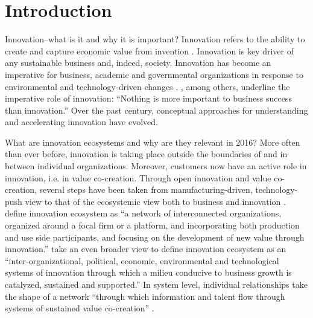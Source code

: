 \chapter{Introduction}
\label{chapter:intro}

Innovation--what is it and why it is important? Innovation refers to the ability to create and capture economic value from invention \citep{Hagel2005TheSpecialization}. Innovation is key driver of any sustainable business and, indeed, society. Innovation has become an imperative for business, academic and governmental organizations in response to environmental and technology-driven changes \citep{Drucker2015InnovationPrinciples,VandeVen1986CentralInnovation,Gupta2007InnovationAnalysis,Schumpeter1942CapitalismDemocracy}. \cite{Carlson2006}, among others, underline the imperative role of innovation: ``Nothing is more important to business success than innovation.'' Over the past century, conceptual approaches for understanding and accelerating innovation have evolved. 

What are innovation ecosystems and why are they relevant in 2016? More often than ever before, innovation is taking place outside the boundaries of and in between individual organizations. Moreover, customers now have an active role in innovation, i.e. in value co-creation. Through open innovation and value co-creation, several steps have been taken from manufacturing-driven, technology-push view \citep{Schumpeter1934TheCycle,Schumpeter1942CapitalismDemocracy,Schumpeter1950TheSocialism} to that of the ecosystemic view both to business and innovation \citep{Russell2011TransformingOrchestration,Moore1993PredatorsCompetition,Jarvi2013}. \cite{Autio2013InnovationManagement} define innovation ecosystem as ``a network of interconnected organizations, organized around a focal firm or a platform, and incorporating both production and use side participants, and focusing on the development of new value through innovation.'' \cite{Russell2011TransformingOrchestration} take an even broader view to define innovation ecosystem as an ``inter-organizational, political, economic, environmental and technological systems of innovation through which a milieu conducive to business growth is catalyzed, sustained and supported.'' In system level, individual relationships take the shape of a network ``through which information and talent flow through systems of sustained value co-creation'' \citep{Russell2015RelationalEcosystems}.

